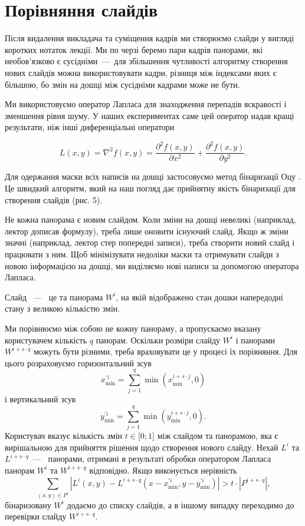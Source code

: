 \section{Порівняння слайдів}

Після видалення викладача та суміщення кадрів ми створюємо слайди у вигляді
коротких нотаток лекції. Ми по черзі беремо пари кадрів панорами, які
необов'язково є сусідніми~---~для збільшення чутливості алгоритму створення нових
слайдів можна використовувати кадри, різниця між індексами яких є більшою, бо
змін на дошці між сусідніми кадрами може не бути.

Ми використовуємо оператор Лапласа  для знаходження перепадів
яскравості і зменшення рівня шуму. У наших експериментах саме цей
оператор надав кращі результати, ніж інші диференціальні оператори

\begin{equation*}
  L(x,y) = \nabla^{2}f(x,y) = \frac{\partial^{2}f(x,y)}{\partial x^{2}} + \frac{\partial^{2}f(x,y)}{\partial y^{2}}.
\end{equation*}

Для одержання маски всіх написів на дошці застосовуємо метод бінаризації
Оцу . Це швидкий алгоритм, який на наш погляд дає прийнятну
якість бінаризації для створення слайдів (рис. 5).

Не кожна панорама є новим слайдом. Коли зміни на дошці невеликі
(наприклад, лектор дописав формулу), треба лише оновити існуючий слайд.
Якщо ж зміни значні (наприклад, лектор стер попередні записи), треба
створити новий слайд і працювати з ним. Щоб мінімізувати недоліки маски
та отримувати слайди з новою інформацією на дошці, ми виділяємо нові
написи за допомогою оператора Лапласа.

\begin{definition}
  Слайд ~---~ це та панорама \(W^{i}\), на якій відображено стан дошки
напередодні стану з великою кількістю змін.
\end{definition}
Ми порівнюємо між собою не
кожну панораму, а пропускаємо вказану користувачем кількість \(q\)
панорам. Оскільки розміри слайду \(W^{i}\) і панорами
\(W^{i + s \cdot q}\) можуть бути різними, треба враховувати це у
процесі їх порівняння. Для цього розраховуємо горизонтальний зсув
$$x_{\min}^{'i} = \sum_{j = 1}^{q}{\min\left( x_{\min}^{i + s \cdot j},0 \right)}$$
і вертикальний зсув
$$y_{\min}^{'i} = \sum_{j = 1}^{q}{\min\left( y_{\min}^{i + s \cdot j},0 \right)}.$$
Користувач вказує кількість змін \(t \in \lbrack 0;1\rbrack\) між
слайдом та панорамою, яка є вирішальною для прийняття рішення щодо
створення нового слайду. Нехай \(L^{i}\) та \(L^{i + s \cdot q}\)~---~
панорами, отримані в результаті обробки оператором Лапласа панорам \(W^{i}\) та
\(W^{i + s \cdot q}\) відповідно. Якщо виконується нерівність
\begin{equation*}
\sum_{(x,y) \in P^{i}}^{}| L^{i}(x,y) - L^{i + s \cdot q}( x - x_{\min}^{'i},y - y_{\min}^{'i} ) | > t \cdot | P^{i + s \cdot q} |,
\end{equation*}
бінаризовану \(W^{i}\) додаємо до списку слайдів, а в іншому випадку переходимо до
перевірки слайду \(W^{i + s \cdot q}\).
